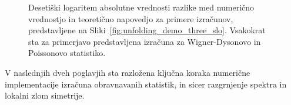 \begin{figure}[H]
\caption{Desetiški logaritem absolutne vrednosti razlike med numerično vrednostjo in teoretično napovedjo za primere izračunov, predstavljene na Sliki~\ref{fig:unfolding_demo_three_slo}. Vsakokrat sta za primerjavo predstavljena izračuna za Wigner-Dysonovo in Poissonovo statistiko. }
\label{fig:unfolding_demo_three_error_slo}
\end{figure}
\noindent
V naslednjih dveh poglavjih sta razložena ključna koraka numerične implementacije izračuna obravnavanih statistik, in sicer razgrnjenje spektra in lokalni zlom simetrije. 
